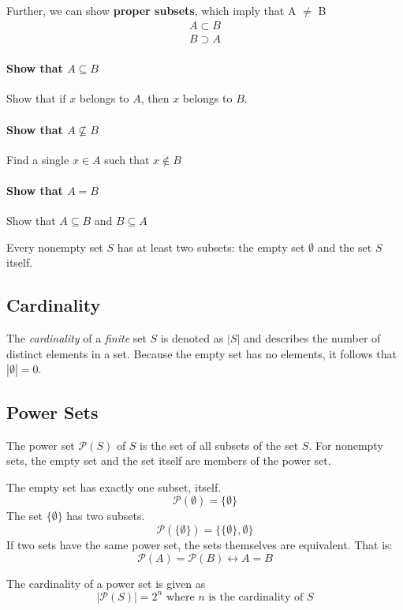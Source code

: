 Further, we can show \textbf{proper subsets}, which imply that A \(\neq \) B
\begin{gather*}
		A \subset B \\
	B \supset A
\end{gather*}

\paragraph{Show that \(A \subseteq B\)} Show that if \(x\) belongs to \(A\), then \(x\) belongs to \(B\).
\paragraph{Show that \(A \not\subseteq B\)} Find a single \(x \in A\) such that \(x \notin B\)
\paragraph{Show that \(A = B\)} Show that \(A \subseteq B\) and \(B \subseteq A\)

Every nonempty set \(S\) has at least two subsets: the empty set \( \emptyset \) and the set \(S\) itself.

\subsection{Cardinality}
The \emph{cardinality} of a \emph{finite }set \(S\) is denoted as \(| S |\) and describes the number of distinct elements in a set. Because the empty set has no elements, it follows that \(| \emptyset | = 0\).

\subsection{Power Sets}
The power set \(\mathcal{P}(S)\) of \(S\) is the set of all subsets of the set \(S\). For nonempty sets, the empty set and the set itself are members of the power set.

The empty set has exactly one subset, itself.
\[
\mathcal{P}(\emptyset) = \{ \emptyset \}
\]
The set \( \{ \emptyset \} \) has two subsets.
\[
\mathcal{P}(\{ \emptyset \}) = \{ \{ \emptyset \}, \emptyset \}
\]
If two sets have the same power set, the sets themselves are equivalent. That is:
\[
	\mathcal{P}(A) = \mathcal{P}(B) \leftrightarrow A = B
\]

The cardinality of a power set is given as
\begin{equation*}
|\mathcal{P}(S)|= 2^n \textrm{ where } n \textrm{ is the cardinality of }S
\end{equation*}


